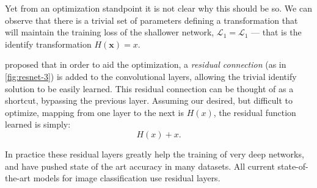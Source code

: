 \documentclass[thesis]{subfiles}
\begin{document}
Yet from an optimization standpoint it is not clear why this should be so. We can observe that there is a trivial set of parameters defining a transformation that will maintain the training loss of the shallower network, \ie $\mathcal{L}_1 = \mathcal{L}_1$ --- that is the identify transformation $H(\mathbf{x})=x$. 

\citet{He2015} proposed that in order to aid the optimization, a \emph{residual connection} (as in \cref{fig:resnet-3}) is added to the convolutional layers, allowing the trivial identify solution to be easily learned. This residual connection can be thought of as a shortcut, bypassing the previous layer. Assuming our desired, but difficult to optimize, mapping from one layer to the next is $H(x)$, the residual function learned is simply:
\begin{equation}
	H(x) + x.
\end{equation}

In practice these residual layers greatly help the training of very deep networks, and have pushed state of the art accuracy in many datasets. All current state-of-the-art models for image classification use residual layers.



\end{document}
